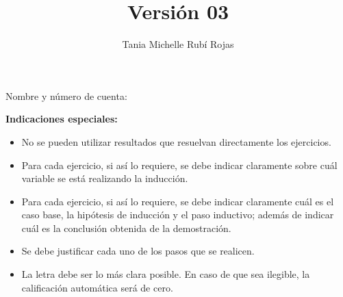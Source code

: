 \documentclass[oneside]{style}
\title{Versión 03}
\author{Tania Michelle Rubí Rojas}
\begin{document}
\maketitle

\vspace{2.5mm}
\noindent
Nombre y número de cuenta: \hrulefill\

\vspace{5mm}
\noindent
\textbf{Indicaciones especiales:}
{\small
\begin{multicols}{2}
\begin{itemize}
  \item No se pueden utilizar resultados que resuelvan directamente los 
  ejercicios. 

  \item Para cada ejercicio, si así lo requiere, se debe indicar claramente
  sobre cuál variable se está realizando la inducción. 

  \item Para cada ejercicio, si así lo requiere, se debe indicar claramente 
  cuál es el caso base, la hipótesis de inducción y el paso inductivo; 
  además de indicar cuál es la conclusión obtenida de la demostración. 

  \item Se debe justificar cada uno de los pasos que se realicen. 

  \item La letra debe ser lo más clara posible. En caso de que sea ilegible, 
  la calificación automática será de cero. 
\end{itemize}
\end{multicols}
}
\end{document}
